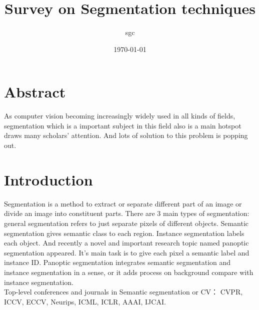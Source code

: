 \documentclass{article}
\title{Survey on Segmentation techniques}
\author{sgc}
\date{\today}
\begin{document}
	\maketitle
	\section{Abstract}
	As computer vision becoming increasingly widely used in all kinds of fields, segmentation which is a important subject in this field also is a main hotspot draws many scholars' attention. And lots of solution to this problem is popping out.
	\section{Introduction}
	Segmentation is a method to extract or separate different part of an image or divide an image into constituent parts. There are  3 main types of segmentation: general segmentation refers to just separate pixels of different objects. Semantic segmentation gives semantic class to each region. Instance segmentation labels each object. And recently a novel and important research topic named panoptic segmentation appeared. It's main task is to give each pixel a semantic label and instance ID. Panoptic segmentation integrates semantic segmentation and instance segmentation in a sense, or it adds process on background compare with instance segmentation.\\
	Top-level conferences and journals in Semantic segmentation or CV： CVPR, ICCV, ECCV, Neurips, ICML, ICLR, AAAI, IJCAI.
\end{document}
